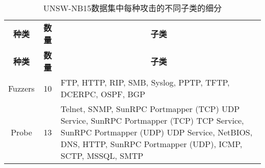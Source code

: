 \begin{table}[htbp]
	\caption{UNSW-NB15数据集中每种攻击的不同子类的细分}
	\label{tab:UNSW-NB15_class}
	\begin{tabularx}{\textwidth}{@{}ccX@{}}
		\toprule
		\multicolumn{1}{c}{\textbf{种类}} & \multicolumn{1}{c}{\textbf{数量}} & \multicolumn{1}{c}{\textbf{子类}}                                                                                                                                                                                                                                                                                                                                                                                                                                                                                                                                   \\
		\multicolumn{1}{c}{\textbf{种类}} & \multicolumn{1}{c}{\textbf{数量}} & \multicolumn{1}{c}{\textbf{子类}}                                                                                                                                                                                                                                                                                                                                                                                                                                                                                                                                   \\
		\midrule
		Fuzzers                           & 10                                & FTP, HTTP, RIP, SMB, Syslog, PPTP, TFTP, DCERPC, OSPF, BGP                                                                                                                                                                                                                                                                                                                                                                                                                                                                                                          \\
		Probe                             & 13                                & Telnet, SNMP, SunRPC Portmapper (TCP) UDP Service, SunRPC Portmapper (TCP) TCP Service, SunRPC Portmapper (UDP) UDP Service, NetBIOS, DNS, HTTP,
		SunRPC Portmapper (UDP), ICMP, SCTP, MSSQL, SMTP                                                                                                                                                                                                                                                                                                                                                                                                                                                                                                                                                                                            \\

\end{tabularx}
\end{table}
